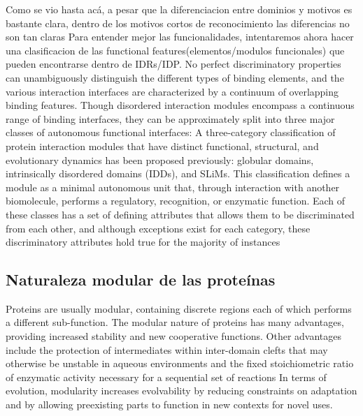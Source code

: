 % 
Como se vio hasta acá, a pesar que la diferenciacion entre dominios y motivos es bastante clara, dentro de los motivos cortos de reconocimiento las diferencias no son tan claras
Para entender mejor las funcionalidades, intentaremos ahora hacer una clasificacion de las functional features(elementos/modulos funcionales) que pueden encontrarse dentro de IDRs/IDP.
No perfect discriminatory properties can unambiguously distinguish the different types of binding elements, and the various interaction interfaces are characterized by a continuum of overlapping
binding features. 
Though disordered interaction modules encompass a continuous range of binding interfaces, they can be approximately split into three major classes of autonomous functional interfaces: 
A three-category classification of protein interaction modules that have distinct functional, structural, and evolutionary dynamics has
been proposed previously: globular domains, intrinsically disordered domains (IDDs), and SLiMs.  This classification
defines a module as a minimal autonomous unit that, through interaction with another biomolecule, performs a regulatory,
recognition, or enzymatic function. Each of these classes has a set of defining attributes that allows them to be discriminated
from each other, and although exceptions exist for each category, these discriminatory attributes hold true for the
majority of instances

















\subsection{Naturaleza modular de las proteínas}


Proteins are usually modular, containing discrete regions each of which performs a different sub-function. 
The modular nature of proteins has many advantages, providing increased stability and new cooperative functions.
Other advantages include the protection of intermediates within inter-domain clefts that may otherwise be unstable in aqueous environments and the fixed stoichiometric ratio of enzymatic activity necessary for a sequential set of reactions
In terms of evolution, modularity increases evolvability by reducing constraints on adaptation and by allowing preexisting parts to function in new contexts for novel uses.

